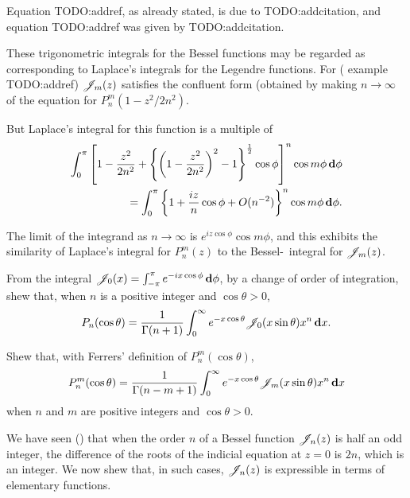 %
%
Equation TODO:addref, as already stated, is due to TODO:addcitation,
and equation TODO:addref was given by TODO:addcitation.

These trigonometric integrals for the Bessel functions may be regarded
as corresponding to Laplace's integrals for the Legendre functions.
For ( example TODO:addref)
$\mathscr{J}_{m}(z)$ satisfies the confluent form (obtained by making
$n \rightarrow \infty$ of the equation for
$P_{n}^{m}(1-z^{2}/2n^{2})$.

But Laplace's integral for this function is a multiple of
\begin{align*}
\int_{0}^{\pi}
\left[ 
  1
  -
  \frac{z^{2}}{2n^{2}}
  +
  \left\{ 
    \left( 
      1 - \frac{z^{2}}{2n^{2}}
     \right)^{2}
    -
    1
   \right\}^{\frac{1}{2}}
  \cos \phi
 \right]^{n} \cos m\phi \, \mathbf{d} \phi
\\
=
\int_{0}^{\pi}
\left\{ 
  1
  + \frac{iz}{n} \cos\phi
  + O(n^{-2})
 \right\}^{n}
\cos m\phi \, \mathbf{d} \phi.
\end{align*}

The limit of the integrand as $n \rightarrow \infty$ is
$e^{iz\cos\phi}\cos m\phi$, and this exhibits the similarity of
Laplace's integral for $P_{n}^{m}(z)$ to the Bessel-\Schlafli\ integral for
$\mathscr{J}_{m}(z)$.
\begin{wandwexample}
  From the integral
  $\mathscr{J}_{0}(x) = \int_{-\pi}^{\pi} e^{-ix\cos\phi}\, \mathbf{d}\phi$, by a
  change of order of integration, shew that, when $n$ is a positive
  integer and $\cos\theta > 0$,
  $$
  P_{n}(\cos\theta)
  =
  \frac{1}{\Gamma(n+1)}
  \int_{0}^{\infty}
  e^{-x\cos\theta}
  \mathscr{J}_{0}(x\sin\theta)
  x^{n}
  \, \mathbf{d} x.
  $$
\end{wandwexample}
\begin{wandwexample}
  Shew that, with Ferrers' definition of $P_{n}^{m}(\cos\theta)$,
  $$
  P_{n}^{m}(\cos\theta)
  =
  \frac{1}{\Gamma(n-m+1)}
  \int_{0}^{\infty}
  e^{-x\cos\theta}
  \mathscr{J}_{m}(x\sin\theta)
  x^{n}
  \, \mathbf{d} x
  $$
  when $n$ and $m$ are positive integers and
  $\cos\theta > 0$.
\end{wandwexample}
We have seen () that when the order $n$ of a
Bessel function $\mathscr{J}_{n}(z)$ is half an odd integer, the difference of the
roots of the indicial equation at $z=0$ is $2n$, which is an integer.
We now shew that, in such cases, $\mathscr{J}_{n}(z)$ is expressible in terms of
elementary functions.

